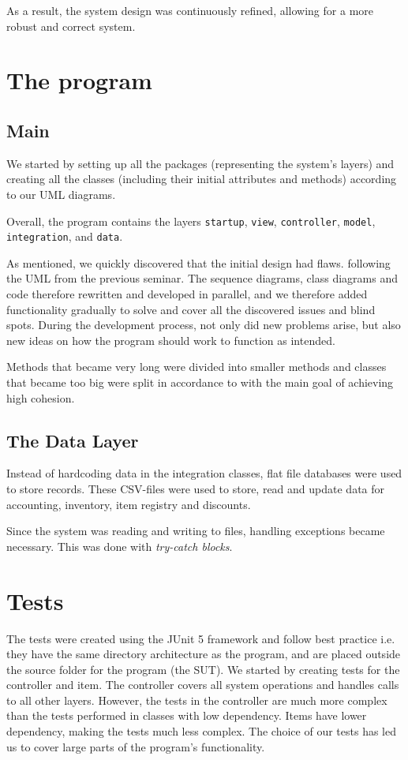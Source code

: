 \documentclass[a4paper]{scrreprt}
\begin{document}
As a result, the system design was continuously refined,
allowing for a more robust and correct system.


\section*{The program}
\subsection*{Main}
We started by setting up all the packages (representing the system's layers)
and creating all the classes (including their initial attributes and methods)
according to our UML diagrams.

Overall, the program
contains the layers
\verb|startup|, \verb|view|, \verb|controller|, \verb|model|,
\verb|integration|, and \verb|data|.

As mentioned, we quickly discovered that the initial design had flaws.
following the UML from the previous seminar.
The sequence diagrams, class diagrams and code therefore rewritten and
developed in parallel, and we therefore added functionality gradually to solve and cover all
the discovered issues and blind spots.
During the development process, not only did new problems arise,
but also new ideas on how the program should work to function as intended.

Methods that became very long were divided into smaller methods and classes that became
too big were split in accordance to with the main goal of achieving high cohesion.

\subsection*{The Data Layer}
Instead of hardcoding data in the integration classes, flat file databases were used to store records.
These CSV-files were used to store, read and update data for accounting, inventory, item registry and discounts.

Since the system was reading and writing to files, handling exceptions became necessary.
This was done with \emph{try-catch blocks}.

\section*{Tests}
The tests were created using the JUnit 5 framework
and follow best practice i.e. they have the same directory architecture as the program,
and are placed outside the source folder for the program (the SUT).
We started by creating tests for the controller and item.
The controller covers all system operations
and handles calls to all other layers.
However, the tests in the controller are
much more complex than the tests performed in classes with low dependency.
Items have lower dependency, making the tests much less complex.
The choice of
our tests has led us to cover large parts of the program's functionality.
\end{document}
